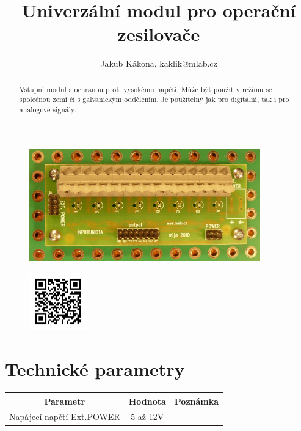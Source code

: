 \documentclass[12pt,a4paper,oneside]{article}
\begin{document}
\title{Univerzální modul pro operační zesilovače}
\author{Jakub Kákona, kaklik@mlab.cz}
\maketitle

\thispagestyle{empty}
\begin{abstract}
Vstupní modul s ochranou proti vysokému napětí. Může být použit v režimu se společnou zemí či s galvanickým oddělením. Je použitelný jak pro digitální, tak i pro analogové signály.
\end{abstract}

\begin{figure} [htbp]
\begin{center}
\includegraphics [width=100mm] {./img/INPUTUNI01A_Top_Big.jpg} 
\end{center}
\end{figure}

\begin{figure} [b]
\includegraphics [width=25mm] {./img/INPUTUNI01A_QRcode.png} 
\end{figure}

\newpage
\tableofcontents

\section{Technické parametry}
\begin{table}[htbp]
\begin{center}
\begin{tabular}{|c|c|p{4.7cm}|}
\hline
Parametr & Hodnota & Poznámka \\
\hline
Napájecí napětí Ext.POWER  & 5 až 12V & \\ 
\hline
\end{tabular}
\end{center}
\end{table}
\end{document}
